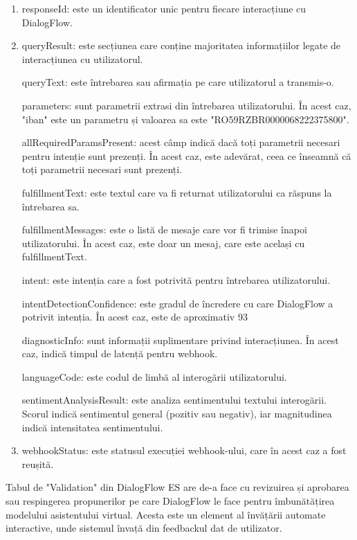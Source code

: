 \begin{enumerate}
    \item responseId: este un identificator unic pentru fiecare interacțiune cu DialogFlow.

    \item queryResult: este secțiunea care conține majoritatea informațiilor legate de interacțiunea cu utilizatorul.
    
    \subitem queryText: este întrebarea sau afirmația pe care utilizatorul a transmis-o.
    
    \subitem parameters: sunt parametrii extrasi din întrebarea utilizatorului. În acest caz, "iban" este un parametru și valoarea sa este "RO59RZBR0000068222375800".
    
    \subitem allRequiredParamsPresent: acest câmp indică dacă toți parametrii necesari pentru intenție sunt prezenți. În acest caz, este adevărat, ceea ce înseamnă că toți parametrii necesari sunt prezenți.
    
    \subitem fulfillmentText: este textul care va fi returnat utilizatorului ca răspuns la întrebarea sa.
    
    \subitem fulfillmentMessages: este o listă de mesaje care vor fi trimise înapoi utilizatorului. În acest caz, este doar un mesaj, care este același cu fulfillmentText.
    
    \subitem intent: este intenția care a fost potrivită pentru întrebarea utilizatorului.
    
    \subitem intentDetectionConfidence: este gradul de încredere cu care DialogFlow a potrivit intenția. În acest caz, este de aproximativ 93%
    
    \subitem diagnosticInfo: sunt informații suplimentare privind interacțiunea. În acest caz, indică timpul de latență pentru webhook.
    
    \subitem languageCode: este codul de limbă al interogării utilizatorului.
    
    \subitem sentimentAnalysisResult: este analiza sentimentului textului interogării. Scorul indică sentimentul general (pozitiv sau negativ), iar magnitudinea indică intensitatea sentimentului.
    
    \item webhookStatus: este statusul execuției webhook-ului, care în acest caz a fost reușită.
\end{enumerate}

Tabul de "Validation" din DialogFlow ES are de-a face cu revizuirea și aprobarea sau respingerea propunerilor pe care DialogFlow le face pentru îmbunătățirea modelului asistentului virtual. Acesta este un element al învățării automate interactive, unde sistemul învață din feedbackul dat de utilizator.

